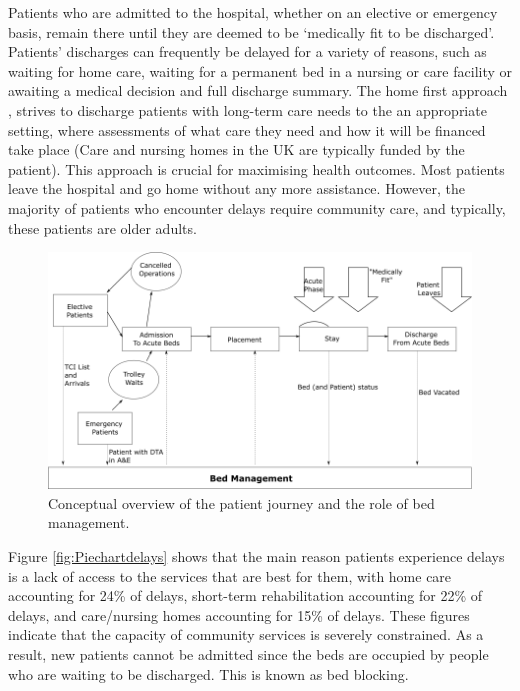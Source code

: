 \documentclass[../thesis.tex]{subfiles}
\begin{document}
Patients who are admitted to the hospital, whether on an elective or emergency basis, remain there until they are deemed to be `medically fit to be discharged'. Patients' discharges can frequently be delayed for a variety of reasons, such as waiting for home care, waiting for a permanent bed in a nursing or care facility  or awaiting a medical decision and full discharge summary. The home first approach \cite{NHSEnglandb}, strives to discharge patients with long-term care needs to the an appropriate setting, where assessments of what care they need and how it will be financed take place (Care and nursing homes in the UK are typically funded by the patient). This approach is crucial for maximising health outcomes.  Most patients leave the hospital and go home without any more assistance. However, the majority of patients who encounter delays require community care, and typically, these patients are older adults.

\begin{figure}[h!]
    \centering
    \includegraphics[scale=0.6]{Chapters/Chapter1/Figures/bedmanagement.png}
    \caption{Conceptual overview of the patient journey and the role of bed management.} %
    \label{fig:bedmanagement}
\end{figure}



Figure \ref{fig:Piechartdelays} shows that the main reason patients experience delays is a lack of access to the services that are best for them, with home care accounting for 24\% of delays, short-term rehabilitation accounting for 22\% of delays, and care/nursing homes accounting for 15\% of delays. These figures indicate that the capacity of community services is severely constrained. As a result, new patients cannot be admitted since the beds are occupied by people who are waiting to be discharged. This is known as bed blocking.
\end{document}
